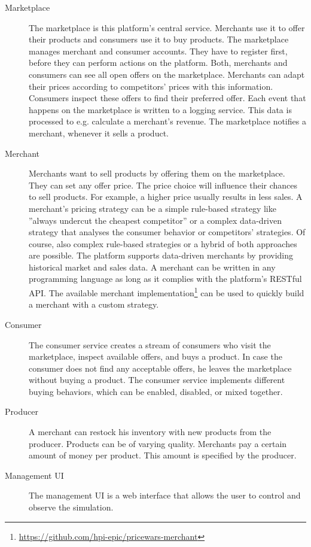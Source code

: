 \begin{description}
	\item [Marketplace]
		The marketplace is this platform's central service.
		Merchants use it to offer their products and consumers use it to buy products.
		The marketplace manages merchant and consumer accounts.
		They have to register first, before they can perform actions on the platform.
		Both, merchants and consumers can see all open offers on the marketplace.
		Merchants can adapt their prices according to competitors' prices with this information.
		Consumers inspect these offers to find their preferred offer.
		Each event that happens on the marketplace is written to a logging service.
		This data is processed to e.g. calculate a merchant's revenue.
		The marketplace notifies a merchant, whenever it sells a product.
	\item [Merchant]
		Merchants want to sell products by offering them on the marketplace.
		They can set any offer price.
		The price choice will influence their chances to sell products.
		For example, a higher price usually results in less sales.
		A merchant's pricing strategy can be a simple rule-based strategy like ''always undercut the cheapest competitor'' or a complex data-driven strategy that analyses the consumer behavior or competitors' strategies.
		Of course, also complex rule-based strategies or a hybrid of both approaches are possible.
		The \pricewars platform supports data-driven merchants by providing historical market and sales data.
		A merchant can be written in any programming language as long as it complies with the platform's RESTful API.
		The available merchant implementation\footnote{\url{https://github.com/hpi-epic/pricewars-merchant}} can be used to quickly build a merchant with a custom strategy.
	\item [Consumer]
		The consumer service creates a stream of consumers who visit the marketplace, inspect available offers, and buys a product.
		In case the consumer does not find any acceptable offers, he leaves the marketplace without buying a product.
		The consumer service implements different buying behaviors, which can be enabled, disabled, or mixed together.
	\item [Producer]
		A merchant can restock his inventory with new products from the producer.
		Products can be of varying quality.
		Merchants pay a certain amount of money per product.
		This amount is specified by the producer.
	\item [Management UI]
		The management UI is a web interface that allows the user to control and observe the simulation.

\end{description}
